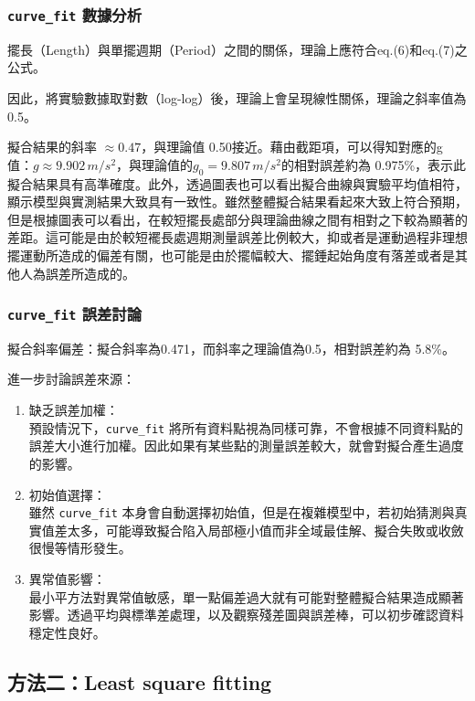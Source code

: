 \documentclass[12pt,a4paper]{article}
\begin{document}
\begin{CJK}{UTF8}{bkai}
\subsubsection{\texttt{curve\_fit} 數據分析}
\hfill

擺長（Length）與單擺週期（Period）之間的關係，理論上應符合eq.(6)和eq.(7)之公式。

因此，將實驗數據取對數（log-log）後，理論上會呈現線性關係，理論之斜率值為 0.5。

擬合結果的斜率 $\approx0.47$，與理論值 0.50接近。藉由截距項，可以得知對應的g值：$g\approx9.902 \,m/s^2$，與理論值的$g_0 =9.807\,m/s^2$的相對誤差約為 0.975\%，表示此擬合結果具有高準確度。此外，透過圖表也可以看出擬合曲線與實驗平均值相符，顯示模型與實測結果大致具有一致性。雖然整體擬合結果看起來大致上符合預期，但是根據圖表可以看出，在較短擺長處部分與理論曲線之間有相對之下較為顯著的差距。這可能是由於較短襬長處週期測量誤差比例較大，抑或者是運動過程非理想擺運動所造成的偏差有關，也可能是由於擺幅較大、擺錘起始角度有落差或者是其他人為誤差所造成的。

\subsubsection{\texttt{curve\_fit} 誤差討論}
\hfill

擬合斜率偏差：擬合斜率為0.471，而斜率之理論值為0.5，相對誤差約為 5.8\%。

進一步討論誤差來源：
\begin{enumerate}
    \item 缺乏誤差加權：\\預設情況下，\texttt{curve\_fit} 將所有資料點視為同樣可靠，不會根據不同資料點的誤差大小進行加權。因此如果有某些點的測量誤差較大，就會對擬合產生過度的影響。
    \item 初始值選擇：\\ 雖然 \texttt{curve\_fit} 本身會自動選擇初始值，但是在複雜模型中，若初始猜測與真實值差太多，可能導致擬合陷入局部極小值而非全域最佳解、擬合失敗或收斂很慢等情形發生。
    \item 異常值影響：\\最小平方法對異常值敏感，單一點偏差過大就有可能對整體擬合結果造成顯著影響。透過平均與標準差處理，以及觀察殘差圖與誤差棒，可以初步確認資料穩定性良好。
\end{enumerate}

\subsection{方法二：Least square fitting}
\hfill


\end{CJK}
\end{document}
